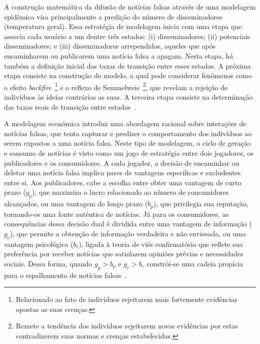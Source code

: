 \documentclass{SBCbookchapter}
\begin{document}
A construção matemática da difusão de notícias falsas através de uma modelagem epidêmica visa principalmente a predição do número de disseminadores (temperatura geral).
Essa estratégia de modelagem inicia com uma etapa que associa cada usuário a um dentre três estados: (i) disseminadores; (ii) potenciais disseminadores; e (iii) disseminadores arrependidos, aqueles que após encaminharem ou publicarem uma notícia falsa a apagam. Nesta etapa, há também a definição inicial das taxas de transição entre esses estados. A próxima etapa consiste na construção do modelo, a qual pode considerar fenômenos como o efeito \textit{backfire}~\footnote{Relacionado ao fato de indivíduos rejeitarem mais fortemente evidências opostas as suas crenças.} e o reflexo de Semmelweis~\footnote{Remete a tendência dos indivíduos rejeitarem novas evidências por estas contradizerem suas normas e crenças estabelecidas.}, que revelam a rejeição de indivíduos às ideias contrárias as suas. A terceira etapa consiste na determinação das taxas reais de transição entre estados~\cite{zhou2018fake}.

A modelagem econômica introduz uma abordagem racional sobre interações de notícias falsas, que tenta capturar e predizer o comportamento dos indivíduos ao serem expostos a uma notícia falsa. Neste tipo de modelagem, o ciclo de geração e consumo de notícias é visto como um jogo de estratégia entre dois jogadores, os publicadores e os consumidores.
A cada jogador, a decisão de encaminhar ou deletar uma notícia falsa implica pares de vantagens específicas e excludentes entre si. Aos publicadores, cabe a escolha entre obter uma vantagem de curto prazo ($g_{p}$), que maximiza o lucro relacionado ao número de consumidores alcançados, ou uma vantagem de longo prazo ($b_{p}$), que privilegia sua reputação, tornando-os uma fonte autêntica de notícias. Já para os consumidores, as consequências dessa decisão dual é dividida entre uma vantagem de informação ($g_{c}$), que permite a obtenção de informação verdadeira e não enviesada, ou uma vantagem psicológica ($b_{c}$), ligada à teoria de viés confirmatório que reflete sua preferência por receber notícias que satisfazem opiniões prévias e necessidades sociais. Dessa forma, quando $g_{p} > b_{p}$ e $g_{c} > b_{c}$ constrói-se uma cadeia propícia para o espalhamento de notícias falsas~\cite{shu2017fake}.
\end{document}
